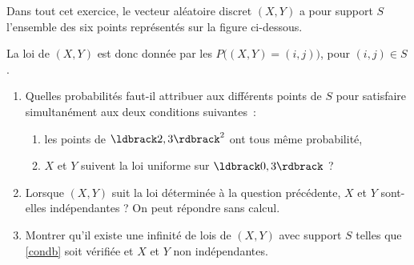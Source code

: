\documentclass[a4paper,12pt,reqno]{amsart}
\begin{document}
\begin{exo}

  Dans tout cet exercice, le vecteur aléatoire discret $(X,Y)$ a pour support $S$ l'ensemble des six points représentés sur la figure ci-dessous.
  \begin{center}
  \end{center}
  La loi de $(X,Y)$ est donc donnée par les $P\big((X,Y)=(i,j)\big)$, pour $(i,j)\in S$.

  \begin{enumerate}
    \item Quelles probabilités faut-il attribuer aux différents points de $S$ pour satisfaire simultanément aux deux conditions suivantes~:
    \begin{enumerate}
      \item\label{conda} les points de $\iintv{2,3}^2$ ont tous même probabilité,
      \item\label{condb} $X$ et $Y$ suivent la loi uniforme sur $\iintv{0,3}$ ?
    \end{enumerate}
    \item Lorsque $(X,Y)$ suit la loi déterminée à la question précédente, $X$ et $Y$ sont-elles indépendantes ? On peut répondre sans calcul.
    \item Montrer qu'il existe une infinité de lois de $(X,Y)$ avec support $S$ telles que \ref{condb} soit vérifiée et $X$ et $Y$ non indépendantes.
  \end{enumerate}

\end{exo}
\end{document}
